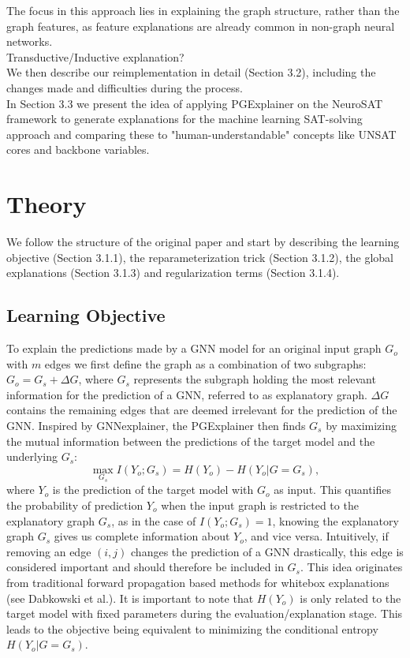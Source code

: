 The focus in this approach lies in explaining the graph structure, rather than the graph features, as feature explanations are already common in non-graph neural networks. \\

Transductive/Inductive explanation? \\

We then describe our reimplementation in detail (Section 3.2), including the changes made and difficulties during the process. \\

In Section 3.3 we present the idea of applying PGExplainer on the NeuroSAT framework to generate explanations for the machine learning SAT-solving approach and comparing these to "human-understandable" concepts like UNSAT cores and backbone variables. 
\section{Theory}
We follow the structure of the original paper\cite{} and start by describing the learning objective (Section 3.1.1), the reparameterization trick (Section 3.1.2), the global explanations (Section 3.1.3) and regularization terms (Section 3.1.4).

\subsection{Learning Objective}
To explain the predictions made by a GNN model for an original input graph $G_o$ with $m$ edges we first define the graph as a combination of two subgraphs: $G_o = G_s + \Delta G$, where $G_s$ represents the subgraph holding the most relevant information for the prediction of a GNN, referred to as explanatory graph. $\Delta G$ contains the remaining edges that are deemed irrelevant for the prediction of the GNN. Inspired by GNNexplainer\cite{ying2019gnnexplainer}, the PGExplainer then finds $G_s$ by maximizing the mutual information between the predictions of the target model and the underlying $G_s$:
\begin{equation}
    \max_{G_s} I(Y_o;G_s) = H(Y_o) - H(Y_o|G=G_s),
\end{equation} 
where $Y_o$ is the prediction of the target model with $G_o$ as input. This quantifies the probability of prediction $Y_o$ when the input graph is restricted to the explanatory graph $G_s$, as in the case of $I(Y_o;G_s) = 1$, knowing the explanatory graph $G_s$ gives us complete information about $Y_o$, and vice versa. Intuitively, if removing an edge $(i,j)$ changes the prediction of a GNN drastically, this edge is considered important and should therefore be included in $G_s$. This idea originates from traditional forward propagation based methods for whitebox explanations (see Dabkowski et al.\cite{dabkowski2017real}).
It is important to note that $H(Y_o)$ is only related to the target model with fixed parameters during the evaluation/explanation stage. This leads to the objective being equivalent to minimizing the conditional entropy $H(Y_o|G=G_s)$.

